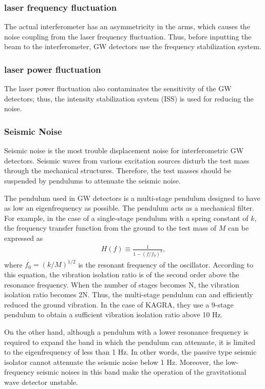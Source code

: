 \subsubsection{laser frequency fluctuation}
The actual interferometer has an asymmetricity in the arms, which causes the noise coupling from the laser frequency fluctuation. Thus, before inputting the beam to the interferometer, GW detectors use the frequency stabilization system.

\subsubsection{laser power fluctuation}
The laser power fluctuation also contaminates the sensitivity of the GW detectors; thus, the intensity stabilization system (ISS) is used for reducing the noise.

\subsubsection{Seismic Noise}
Seismic noise is the most trouble displacement noise for interferometric GW detectors. Seismic waves from various excitation sources disturb the test mass through the mechanical structures. Therefore, the test masses should be suspended by pendulums to attenuate the seismic noise. 

The pendulum used in GW detectors is a multi-stage pendulum designed to have as low an eigenfrequency as possible. The pendulum acts as a mechanical filter. For example, in the case of a single-stage pendulum with a spring constant of $k$, the frequency transfer function from the ground to the test mass of $M$ can be expressed as
\begin{eqnarray} \label{eq:eq502}
  H(f) \equiv \frac{1}{1-(f/f_0)^2},
\end{eqnarray}
where $f_0 = (k/M)^{1/2}$ is the resonant frequency of the oscillator. According to this equation, the vibration isolation ratio is of the second order above the resonance frequency. When the number of stages becomes N, the vibration isolation ratio becomes 2N. Thus, the multi-stage pendulum can and efficiently reduced the ground vibration. In the case of KAGRA, they use a 9-stage pendulum to obtain a sufficient vibration isolation ratio above 10 Hz.

On the other hand, although a pendulum with a lower resonance frequency is required to expand the band in which the pendulum can attenuate, it is limited to the eigenfrequency of less than 1 Hz. In other words, the passive type seismic isolator cannot attenuate the seismic noise below 1 Hz.  Moreover, the low-frequency seismic noises in this band make the operation of the gravitational wave detector unstable.

